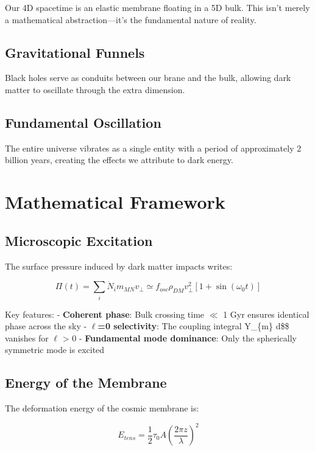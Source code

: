 \documentclass[
  11pt,
]{report}
\begin{document}
Our 4D spacetime is an elastic membrane floating in a 5D bulk. This
isn't merely a mathematical abstraction---it's the fundamental nature of
reality.

\subsection{Gravitational Funnels}\label{gravitational-funnels}

Black holes serve as conduits between our brane and the bulk, allowing
dark matter to oscillate through the extra dimension.

\subsection{Fundamental Oscillation}\label{fundamental-oscillation}

The entire universe vibrates as a single entity with a period of
approximately 2 billion years, creating the effects we attribute to dark
energy.

\section{Mathematical Framework}\label{mathematical-framework}

\subsection{Microscopic Excitation}\label{microscopic-excitation}

The surface pressure induced by dark matter impacts writes:

\[\Pi(t) = \sum_i \dot{N}_i m_{MN} v_{\perp} \simeq f_{osc} \rho_{DM} v_{\perp}^2 [1 + \sin(\omega_0 t)]\]

Key features: - \textbf{Coherent phase}: Bulk crossing time \(\ll\) 1
Gyr ensures identical phase across the sky - \textbf{\(\ell\)=0
selectivity}: The coupling integral \int Y\_\{\ell m\} d\Omega\$\$
vanishes for \(\ell\) \textgreater{} 0 - \textbf{Fundamental mode
dominance}: Only the spherically symmetric mode is excited

\subsection{Energy of the Membrane}\label{energy-of-the-membrane}

The deformation energy of the cosmic membrane is:

\[E_{tens} = \frac{1}{2} \tau_0 A \left(\frac{2\pi z}{\lambda}\right)^2\]
\end{document}
